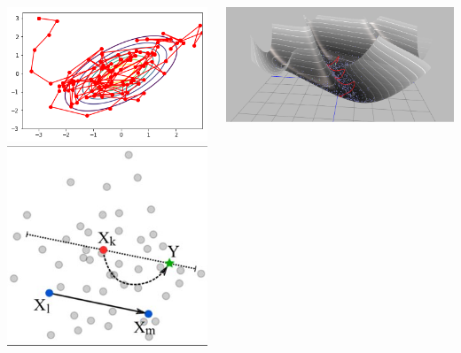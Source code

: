 \documentclass[aspectratio=169]{beamer}
\begin{document}
\begin{frame}
\begin{columns}
\begin{columns}
        \includegraphics[width=\textwidth]{figures/metropolis-hastings}
        \includegraphics[width=\textwidth]{figures/zeus}
        \end{columns}
        \includegraphics[width=\textwidth]{figures/hmc_explained}
    \end{columns}
\end{frame}
\end{document}
